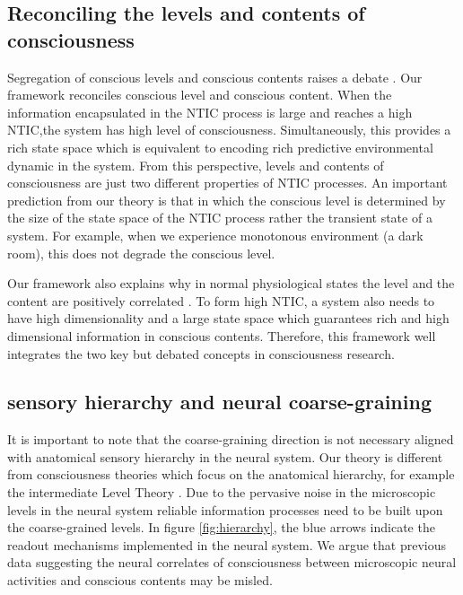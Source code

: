 \documentclass[utf8]{article}
\begin{document}
	    \subsection{Reconciling the levels and contents of consciousness}
	    Segregation of conscious levels and conscious contents raises a debate \citep{bayne2016there, Fazekas2016}. Our framework reconciles conscious level and conscious content. When the information encapsulated in the NTIC process is large and reaches a high NTIC,the system has high level of consciousness. Simultaneously, this provides a rich state space which is equivalent to encoding rich predictive environmental dynamic in the system. From this perspective, levels and contents of consciousness are just two different properties of NTIC processes. An important prediction from our theory is that in which the conscious level is determined by the size of the state space of the NTIC process rather the transient state of a system. For example, when we experience monotonous environment (a dark room), this does not degrade the conscious level.
	    
	    Our framework also explains why in normal physiological states the level and the content are positively correlated \citep{laureys2005neural}\needfig{}. To form high NTIC, a system also needs to have high dimensionality and a large state space which guarantees rich and high dimensional information in conscious contents. Therefore, this framework well integrates the two key but debated concepts in consciousness research. 
			
			
		\subsection{sensory hierarchy and neural coarse-graining}\label{sec:SensoryHierarchy}

        It is important to note that the coarse-graining direction is not necessary aligned with  anatomical sensory hierarchy in the neural system. Our theory is different from consciousness theories which focus on the anatomical hierarchy, for example the intermediate Level Theory \citep[see also \ref{IntermediateLevelTheory}]{prinz2007intermediate, jackendoff1987consciousness}. Due to the pervasive noise in the microscopic levels in the neural system reliable information processes need to be built upon the coarse-grained levels. In figure \ref{fig:hierarchy}, the blue arrows indicate the readout mechanisms implemented in the neural system. We argue that previous data suggesting the neural correlates of consciousness between microscopic neural activities and conscious contents may be misled. 
\end{document}
